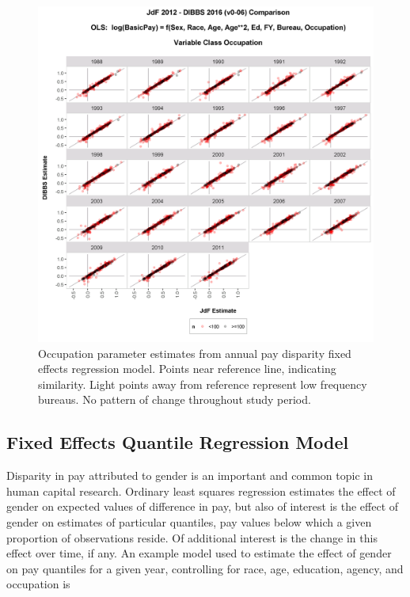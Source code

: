 \documentclass[10pt, letterpaper]{article}
\begin{document}
\begin{spacing}{1.0}
\begin{figure}[]
    \centering
    \includegraphics[width=6in, trim={0 0 0 1in}, clip]{DIBBSEstimateVsJdFEstimateNoInterceptGSPayPlanFixedRefLevel-Occupation.png}
    \caption{Occupation parameter estimates from annual pay disparity fixed effects regression model.  Points near reference line, indicating similarity.  Light points away from reference represent low frequency bureaus.  No pattern of change throughout study period.}
    \label{figure:DIBBSEstimateVsJdFEstimateNoInterceptGSPayPlanFixedRefLevel-Occupation}
\end{figure}

\clearpage

\subsection{Fixed Effects Quantile Regression Model}

Disparity in pay attributed to gender is an important and common topic in human capital research.  Ordinary least squares regression estimates the effect of gender on expected values of difference in pay, but also of interest is the effect of gender on estimates of particular quantiles, pay values below which a given proportion of observations reside.  Of additional interest is the change in this effect over time, if any.  An example model used to estimate the effect of gender on pay quantiles for a given year, controlling for race, age, education, agency, and occupation is\\[-16pt]


\end{spacing}
\end{document}
